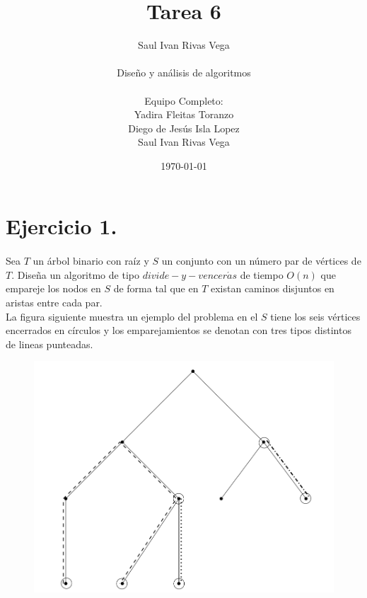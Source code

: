 \documentclass[12pt]{article}
\title{Tarea 6}
\author{
	Saul Ivan Rivas Vega \\
	\\
	Diseño y análisis de algoritmos\\
\\
	Equipo Completo:\\
		Yadira Fleitas Toranzo\\
		Diego de Jesús Isla Lopez\\
		Saul Ivan Rivas Vega\\
}
\date{\today}
\begin{document}
	\maketitle
	\pagebreak
	\section{Ejercicio 1.}
	  \paragraph{} Sea $T$ un árbol binario con raíz y $S$ un conjunto con un número par de vértices de $T$. Diseña un algoritmo de tipo $divide-y-vencer\acute{a}s$ de tiempo $O(n)$ que empareje los nodos en $S$ de forma tal que en $T$ existan caminos disjuntos en aristas entre cada par.
	  \\ La figura siguiente muestra un ejemplo del problema en el $S$ tiene los seis vértices encerrados en círculos y los emparejamientos se denotan con tres tipos distintos de lineas punteadas.
	  \\
	 \begin{figure}[h]
	 	 \begin{center}
	  \includegraphics[scale=0.2]{tree_1}
	 	 \end{center}
	  	 \end{figure}
\end{document}
